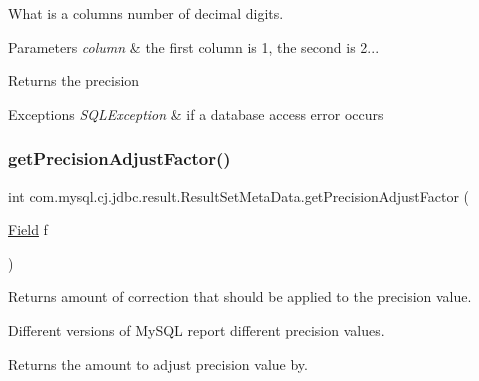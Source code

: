 What is a column\textquotesingle{}s number of decimal digits.


\begin{DoxyParams}{Parameters}
{\em column} & the first column is 1, the second is 2...\\
\hline
\end{DoxyParams}
\begin{DoxyReturn}{Returns}
the precision
\end{DoxyReturn}

\begin{DoxyExceptions}{Exceptions}
{\em S\+Q\+L\+Exception} & if a database access error occurs \\
\hline
\end{DoxyExceptions}
\mbox{\label{classcom_1_1mysql_1_1cj_1_1jdbc_1_1result_1_1_result_set_meta_data_a783ecdb9c7cacbc43faec6578c7b124d}} 
\subsubsection{\texorpdfstring{get\+Precision\+Adjust\+Factor()}{getPrecisionAdjustFactor()}}
{\footnotesize\ttfamily int com.\+mysql.\+cj.\+jdbc.\+result.\+Result\+Set\+Meta\+Data.\+get\+Precision\+Adjust\+Factor (\begin{DoxyParamCaption}\item[{\mbox{\hyperlink{classcom_1_1mysql_1_1cj_1_1result_1_1_field}{Field}}}]{f }\end{DoxyParamCaption})}

Returns amount of correction that should be applied to the precision value.

Different versions of My\+S\+QL report different precision values.

\begin{DoxyReturn}{Returns}
the amount to adjust precision value by. 
\end{DoxyReturn}
\mbox{\label{classcom_1_1mysql_1_1cj_1_1jdbc_1_1result_1_1_result_set_meta_data_aca119b251bf316c2191439a84970b275}} 

